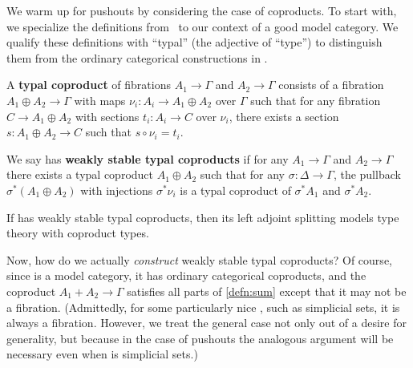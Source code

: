 \documentclass{amsart}
\begin{document}
We warm up for pushouts by considering the case of coproducts.
To start with, we specialize the definitions from~\cite[\S3.4.1]{lw:localuniv} to our context of a good model category.
We qualify these definitions with ``typal'' (the adjective of ``type'') to distinguish them from the ordinary categorical constructions in \sM.

\begin{defn}\label{defn:sum}
  A \textbf{typal coproduct} of fibrations $A_1\to \Gamma$ and $A_2\to\Gamma$ consists of a fibration $A_1\oplus A_2 \to\Gamma$ with maps $\nu_i: A_i \to A_1\oplus A_2$ over $\Gamma$ such that for any fibration $C\to A_1\oplus A_2$ with sections $t_i : A_i \to C$ over $\nu_i$, there exists a section $s:A_1\oplus A_2 \to C$ such that $s\circ \nu_i = t_i$.

  We say \sM has \textbf{weakly stable typal coproducts} if for any $A_1\to \Gamma$ and $A_2\to\Gamma$ there exists a typal coproduct $A_1\oplus A_2$ such that for any $\sigma:\Delta\to\Gamma$, the pullback $\sigma^*(A_1\oplus A_2)$ with injections $\sigma^*\nu_i$ is a typal coproduct of $\sigma^*A_1$ and $\sigma^* A_2$.
\end{defn}

\begin{thm}
  If \sM has weakly stable typal coproducts, then its left adjoint splitting models type theory with coproduct types.
\end{thm}

Now, how do we actually \emph{construct} weakly stable typal coproducts?
Of course, since \sM is a model category, it has ordinary categorical coproducts, and the coproduct $A_1 + A_2 \to \Gamma$ satisfies all parts of \cref{defn:sum} except that it may not be a fibration.
(Admittedly, for some particularly nice \sM, such as simplicial sets, it is always a fibration.
However, we treat the general case not only out of a desire for generality, but because in the case of pushouts the analogous argument will be necessary even when \sM is simplicial sets.)
\end{document}
